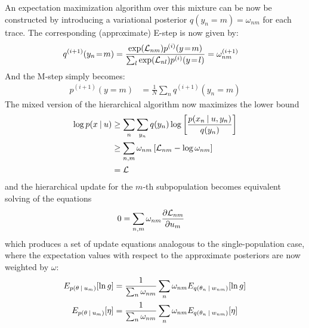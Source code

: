 An expectation maximization algorithm over this mixture can be now be constructed by introducing a variational posterior $q(y_n \!=\! m) = \omega_{nm}$ for each trace. The corresponding (approximate) E-step is now given by:
\begin{align}
  q^{(i+1)}(y_n \!=\! m) 
  &=
  \frac{\exp(\mathcal{L}_{nm}) p^{(i)}(y \!=\! m)}{\sum_l \exp(\mathcal{L}_{nl}) p^{(i)}(y \!=\! l)}        
  = \omega^{(i+1)}_{nm}
\end{align}
And the M-step simply becomes:
\begin{align}
  p^{(i+1)}(y = m)
  &=
  \frac{1}{N} \sum_n q^{(i+1)}(y_n = m)
\end{align}
The mixed version of the hierarchical algorithm now maximizes the lower bound
\begin{align}
 \log p(x \:|\: u)
 &\geq
 \sum_{n} \sum_{y_n} q(y_n) \log \left[ \frac{p(x_n \:|\: u, y_n)}{q(y_n)} \right]\\
 &\geq
 \sum_{n,m} \omega_{nm} \left[ \mathcal{L}_{nm} -  \log \omega_{nm} \right] \\
 &=
 \mathcal{L}
\end{align}
and the hierarchical update for the $m$-th subpopulation becomes equivalent solving of the equations  
\begin{align}
 0
 &=
 \sum_{n,m} \omega_{nm} \frac{\partial \mathcal{L}_{nm}}{\partial u_m}
\end{align}
which produces a set of update equations analogous to the single-population case, where the expectation values with respect to the approximate posteriors are now weighted by $\omega$:
\begin{align}
 E_{p(\theta \:|\: u_m)} [ \ln g ]
 &= 
 \frac{1}{\sum_n \omega_{nm}} \sum_n \omega_{nm} E_{q(\theta_n \:|\: w_{nm})} [ \ln g ] \\
 E_{p(\theta \:|\: u_m)} [ \eta ]
 &= 
 \frac{1}{\sum_n \omega_{nm}} \sum_n \omega_{nm} E_{q(\theta_n \:|\: w_{nm})} [ \eta ]
\end{align}



